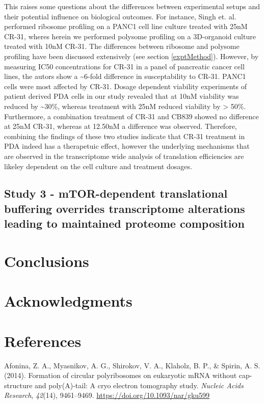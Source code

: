 \documentclass[12pt,openany]{book}
\begin{document}
This raises some questions about the differences between experimental
setups and their potential influence on biological outcomes. For
instance, Singh et. al. performed ribosome profiling on a PANC1 cell
line culture treated with 25nM CR-31, wheres herein we performed
polysome profiling on a 3D-organoid culture treated with 10nM CR-31. The
differences between ribosome and polysome profiling have been discussed
extensively (see section \ref{exptMethod}). However, by measuring IC50
concentrations for CR-31 in a panel of pancreatic cancer cell lines, the
autors show a \textasciitilde{}6-fold difference in susceptability to
CR-31. PANC1 cells were most affected by CR-31. Dosage dependent
viability experiments of patient derived PDA cells in our study revealed
that at 10nM viability was reduced by \textasciitilde{}30\%, whereas
treatment with 25nM reduced viability by \textgreater{} 50\%.
Furthermore, a combination treatment of CR-31 and CB839 showed no
difference at 25nM CR-31, whereas at 12.50nM a difference was observed.
Therefore, combining the findings of these two studies indicate that
CR-31 treatment in PDA indeed has a therapetuic effect, however the
underlying mechanisms that are observed in the transcriptome wide
analysis of translation efficiencies are likeley dependent on the cell
culture and treatment dosages.

\section{Study 3 - mTOR-dependent translational buffering overrides transcriptome alterations leading to
maintained proteome composition}

\chapter{Conclusions}

\chapter*{Acknowledgments}\label{acknowledgments}

\chapter*{References}\label{references}

\hypertarget{refs}{}
\hypertarget{ref-Afonina2014}{}
Afonina, Z. A., Myasnikov, A. G., Shirokov, V. A., Klaholz, B. P., \&
Spirin, A. S. (2014). Formation of circular polyribosomes on eukaryotic
mRNA without cap-structure and poly(A)-tail: A cryo electron tomography
study. \emph{Nucleic Acids Research}, \emph{42}(14), 9461--9469.
\url{https://doi.org/10.1093/nar/gku599}
\end{document}
